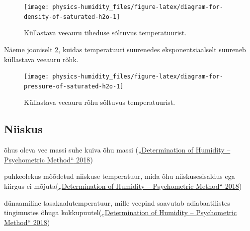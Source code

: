 \documentclass[
  12pt,
  a4paper,
  onecolumn, twoside]{article}
\newenvironment{Shaded}{\begin{snugshade}}{\end{snugshade}}
\newcommand{\AttributeTok}[1]{\textcolor[rgb]{0.77,0.63,0.00}{#1}}
\newcommand{\FunctionTok}[1]{\textcolor[rgb]{0.00,0.00,0.00}{#1}}
\newcommand{\NormalTok}[1]{#1}
\newcommand{\SpecialCharTok}[1]{\textcolor[rgb]{0.00,0.00,0.00}{#1}}
\newcommand{\StringTok}[1]{\textcolor[rgb]{0.31,0.60,0.02}{#1}}
\providecommand{\tightlist}{%
  \setlength{\itemsep}{0pt}\setlength{\parskip}{0pt}}
\begin{document}
\begin{figure}
\texttt{[image: physics-humidity\_files/figure-latex/diagram-for-density-of-saturated-h2o-1]} \caption{Küllastava veeauru tiheduse sõltuvus temperatuurist.}\label{fig:diagram-for-density-of-saturated-h2o}
\end{figure}

Näeme jooniselt \ref{fig:diagram-for-pressure-of-saturated-h2o}, kuidas temperatuuri suurenedes eksponentsiaalselt suureneb küllastava veeauru rõhk.

\begin{Shaded}
\end{Shaded}

\begin{figure}
\texttt{[image: physics-humidity\_files/figure-latex/diagram-for-pressure-of-saturated-h2o-1]} \caption{Küllastava veeauru rõhu sõltuvus temperatuurist.}\label{fig:diagram-for-pressure-of-saturated-h2o}
\end{figure}

\hypertarget{niiskus}{%
\subsection{Niiskus}\label{niiskus}}

\begin{description}
\tightlist
\item[niiskus]
õhus oleva vee massi suhe kuiva õhu massi (\protect\hyperlink{ref-a2018_determination}{{„Determination of Humidity -- Psychometric Method``} 2018})
\item[kuivkolvi temperatuur]
puhkeolekus mõõdetud niiskuse temperatuur, mida õhu niiskusesisaldus ega kiirgus ei mõjuta(\protect\hyperlink{ref-a2018_determination}{{„Determination of Humidity -- Psychometric Method``} 2018})
\item[märgkolbi temperatuur]
dünaamiline tasakaalutemperatuur, mille veepind saavutab adiabaatilistes tingimustes õhuga kokkupuutel(\protect\hyperlink{ref-a2018_determination}{{„Determination of Humidity -- Psychometric Method``} 2018})
\end{description}
\end{document}
